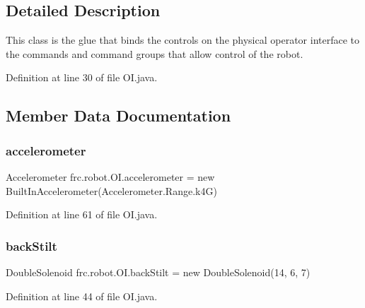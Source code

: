 \subsection{Detailed Description}
This class is the glue that binds the controls on the physical operator interface to the commands and command groups that allow control of the robot. 

Definition at line 30 of file O\+I.\+java.



\subsection{Member Data Documentation}
\mbox{\label{classfrc_1_1robot_1_1OI_a57e609e018f3013d5beb8bffa5771df0}} 
\subsubsection{\texorpdfstring{accelerometer}{accelerometer}}
{\footnotesize\ttfamily Accelerometer frc.\+robot.\+O\+I.\+accelerometer = new Built\+In\+Accelerometer(Accelerometer.\+Range.\+k4G)\hspace{0.3cm}{\ttfamily [static]}}



Definition at line 61 of file O\+I.\+java.

\mbox{\label{classfrc_1_1robot_1_1OI_a89667abb08d7721a47088f0218fd5afa}} 
\subsubsection{\texorpdfstring{back\+Stilt}{backStilt}}
{\footnotesize\ttfamily Double\+Solenoid frc.\+robot.\+O\+I.\+back\+Stilt = new Double\+Solenoid(14, 6, 7)\hspace{0.3cm}{\ttfamily [static]}}



Definition at line 44 of file O\+I.\+java.

\mbox{\label{classfrc_1_1robot_1_1OI_a951d7ff102fca8319e5a9401a0f2214b}} 
